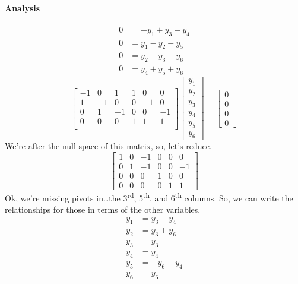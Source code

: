 \documentclass{article}
\begin{document}
        \paragraph{Analysis}
            \begin{align*}
                0&=-y_1+y_3+y_4\\
                0&=y_1-y_2-y_5\\
                0&=y_2-y_3-y_6\\
                0&=y_4+y_5+y_6
            \end{align*}
            \[
                \begin{bmatrix}
                    -1 &  0 &  1 &  1 &  0 &  0 \\
                     1 & -1 &  0 &  0 & -1 &  0 \\
                     0 &  1 & -1 &  0 &  0 & -1 \\
                     0 &  0 &  0 &  1 &  1 &  1 \\
                \end{bmatrix}
                \begin{bmatrix}
                    y_1 \\ y_2 \\ y_3 \\ y_4 \\ y_5 \\ y_6
                \end{bmatrix}
                =
                \begin{bmatrix}
                    0 \\ 0 \\ 0 \\ 0
                \end{bmatrix}
            \]
            We're after the null space of this matrix, so, let's reduce.
            \[
                \begin{bmatrix}
                    1 & 0 & -1 & 0 & 0 & 0 \\
                    0 & 1 & -1 & 0 & 0 & -1 \\
                    0 & 0 & 0 & 1 & 0 & 0 \\
                    0 & 0 & 0 & 0 & 1 & 1 
                \end{bmatrix}
            \]
            Ok, we're missing pivots in\dots the 3\textsuperscript{rd}, 5\textsuperscript{th}, and 6\textsuperscript{th} columns.
            So, we can write the relationships for those in terms of the other variables.
            \begin{align*}
                y_1&=y_3-y_4\\
                y_2&=y_3+y_6\\
                y_3&=y_3\\
                y_4&=y_4\\
                y_5&=-y_6-y_4\\
                y_6&=y_6
            \end{align*}
\end{document}
